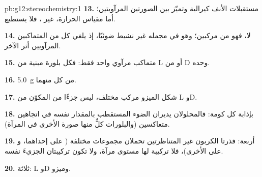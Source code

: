 \begin{solution}{pb:g12:stereochemistry:1}
\textbf{13.} مستقبلات الأنف كيرالية وتميّز بين
الصورتين المرآويتين؛ أما مقياس الحرارة، غير ، فلا يستطيع.

\textbf{14.} لا، فهو  من مركبين؛ وهو في مجمله غير
نشيط ضوئيًا، إذ يلغي كل من المتماكبين المرآويين أثر الآخر.

\textbf{15.} متماكب مرآوي واحد فقط: فكل بلورة مبنية من L أو من D
وحده.

\textbf{16.} \qty{5.0}{g} من كل منهما.

\textbf{17.} شكل الميزو مركب مختلف، ليس جزءًا من
 المكوّن من L وD.

\textbf{18.} بإذابة كل كومة: فالمحلولان يديران الضوء المستقطب
بالمقدار نفسه في اتجاهين متعاكسين (والبلورات كلٌّ منها صورة الأخرى
في المرآة).

\textbf{19.} أربعة: فذرتا الكربون غير المتناظرتين تحملان مجموعات مختلفة
( على إحداهما، و على الأخرى)، فلا تركيبة لها مستوى
مرآة، ولا تكون تركيبتان الجزيءَ نفسه.

\textbf{20.} ثلاثة: L وD وميزو.
\end{solution}
